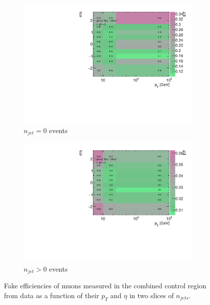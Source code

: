 \begin{figure}[!htbp]
        \begin{center}
        \begin{subfigure}{.49\textwidth}
            \centering
            \includegraphics[width=.95\linewidth]{figures/Analysis/Background/njet0_FakeEfficiency3D_mu_pt_eta.pdf}
            \caption{$n_{jet}=0$ events \label{fig:FakeEff_3D_Muon_njet0}}
        \end{subfigure}
        \begin{subfigure}{.49\textwidth}
            \centering
            \includegraphics[width=.95\linewidth]{figures/Analysis/Background/njet1_FakeEfficiency3D_mu_pt_eta.pdf}
            \caption{$n_{jet}>0$ events \label{fig:FakeEff_3D_Muon_njet1}}
        \end{subfigure}
        \end{center}
    \caption{Fake efficiencies of muons measured in the combined control region from data as a function of their $p_{T}$ and $\eta$ in two slices of $n_{jets}$. \label{fig:MuonFakeEff}}
\end{figure}

